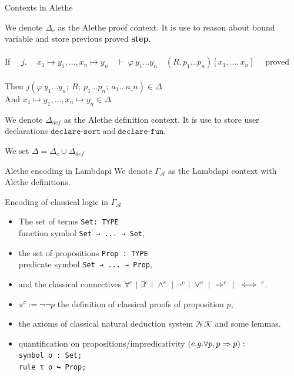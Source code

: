 \documentclass[aspectratio=169,xcolor={dvipsnames}]{beamer}
\begin{document}
\AtBeginSection[]
{
  \begin{frame}
    \tableofcontents[currentsection]
  \end{frame}
}


\begin{frame}{Contexts in Alethe}
\begin{definition}
We denote $\Delta_c$ as the Alethe proof context.
It is use to reason about bound variable and store previous proved \textbf{step}.\\\\
If $\quad j.\quad ~ x_1 \mapsto y_1, \dots , x_n \mapsto y_n \quad \vdash~ \varphi~y_1 \dots y_n \quad (R, p_1 \dots p_n)[x_1, \dots, x_n]\quad$ proved\\\\
Then $j(\varphi~y_1 \dots y_n;~R;~p_1 \dots p_n;~a_1 \dots a\_n) \in \Delta$\\
And $x_1 \mapsto y_1, \dots , x_n \mapsto y_n \in \Delta$
\end{definition}
\vfill
\begin{definition}
We denote $\Delta_{def}$ as the Alethe definition context.
It is use to store user declarations $\texttt{declare-sort}~\text{and}~\texttt{declare-fun}$.\\
\end{definition}
\begin{definition} We set $\Delta = \Delta_c \cup \Delta_{def}$ \end{definition}
\end{frame}

\begin{frame}[t, fragile]{Alethe encoding in Lambdapi}
We denote $\Gamma_\mathcal{A}$ as the Lambdapi context with Alethe definitions.
\begin{block}{Encoding of classical logic in $\Gamma_\mathcal{A}$ \footnotemark[1]}
\begin{itemize}
\item The set of terms \lstinline{Set: TYPE}\\
    function symbol \lstinline{Set → ... → Set},
\item the set of propositions \lstinline{Prop : TYPE}\\
    predicate symbol \lstinline{Set → ... → Prop},
\item and the classical connectives $\forall^c ~|~ \exists^c ~|~ \land^c ~|~ \neg^c ~|~ \lor^c ~|~ \Rightarrow^c ~|~ \iff^c$.
\item $\pi^c := \neg \neg p$ the definition of classical proofs of proposition $p$,
\item the axioms of classical natural deduction system $\mathcal{NK}$ and some lemmas.
\item quantification on propositions/impredicativity $(e.g. \forall p, p \Rightarrow p):$\\
\lstinline{symbol o : Set;}\\
\lstinline{rule τ o ↪ Prop;}
\end{itemize}
\end{block}
\end{frame}
\end{document}
